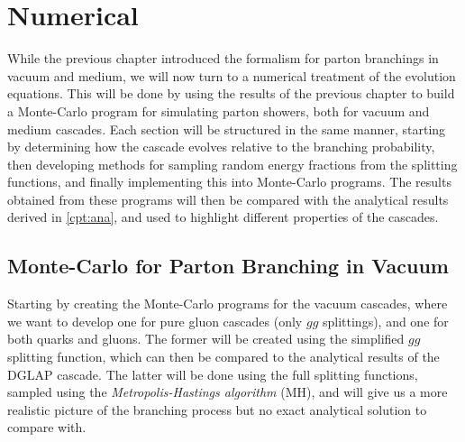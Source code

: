 \documentclass[main.tex]{subfiles}
\begin{document}
\chapter{Numerical}\label{cpt:num}

While the previous chapter introduced the formalism for parton branchings in vacuum and medium, we will now turn to a numerical treatment of the evolution equations. This will be done by using the results of the previous chapter to build a Monte-Carlo program for simulating parton showers, both for vacuum and medium cascades. Each section will be structured in the same manner, starting by determining how the cascade evolves relative to the branching probability, then developing methods for sampling random energy fractions from the splitting functions, and finally implementing this into Monte-Carlo programs. The results obtained from these programs will then be compared with the analytical results derived in \autoref{cpt:ana}, and used to highlight different properties of the cascades.

\section{Monte-Carlo for Parton Branching in Vacuum}
Starting by creating the Monte-Carlo programs for the vacuum cascades, where we want to develop one for pure gluon cascades (only \(gg\) splittings), and one for both quarks and gluons. The former will be created using the simplified \(gg\) splitting function, which can then be compared to the analytical results of the DGLAP cascade. The latter will be done using the full splitting functions, sampled using the \emph{Metropolis-Hastings algorithm} (MH), and will give us a more realistic picture of the branching process but no exact analytical solution to compare with.
\end{document}
